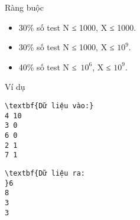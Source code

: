 Ràng buộc
\begin{itemize}
	\item 30\% số test N ≤ 1000, X ≤ 1000.
	\item 30\% số test N ≤ 1000, X ≤ $10^{9}$.
	\item 40\% số test N ≤ $10^{6}$, X ≤ $10^{9}$.
\end{itemize}
Ví dụ
\begin{verbatim}
\textbf{Dữ liệu vào:}
4 10
3 0
6 0
2 1
7 1\end{verbatim}
\begin{verbatim}
\textbf{Dữ liệu ra:
}6
8
3
3\end{verbatim}